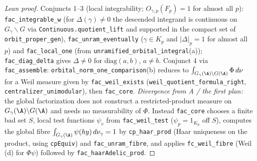 \begin{proof}[Lean proof]
Conjuncts 1--3 (local integrability; $O_{\gamma,p}(F_p)=1$ for almost all $p$): \texttt{fac\_integrable\_w} (for $\Delta(\gamma)\ne0$ the descended integrand is continuous on $G_\gamma\backslash G$ via \texttt{Continuous.quotient\_lift} and supported in the compact set of \texttt{orbit\_proper\_gen}), \texttt{fac\_unram\_eventually} ($\gamma\in K_p$ and $|\Delta|_p=1$ for almost all $p$) and \texttt{fac\_local\_one} (from \texttt{unramified\_orbital\_integral}(a)); \texttt{fac\_diag\_delta} gives $\Delta\ne0$ for $\mathrm{diag}(a,b)$, $a\ne b$. Conjunct 4 via \texttt{fac\_assemble}: \texttt{orbital\_norm\_one\_comparison}(b) reduces to $\int_{G_\gamma(\A)\backslash G(\A)}\Phi\,d\nu$ for a Weil measure given by \texttt{fac\_weil\_exists} (\texttt{weil\_quotient\_formula\_right}, \texttt{centralizer\_unimodular}), then \texttt{fac\_core}. \emph{Divergence from A / the first plan:} the global factorization does not construct a restricted-product measure on $G_\gamma(\A)\backslash G(\A)$ and needs no measurability of $\Phi$. Instead \texttt{fac\_core} chooses a finite bad set $S$, local test functions $\psi_v$ from \texttt{fac\_weil\_test} ($\psi_p=1_{K_p}$ off $S$), computes the global fibre $\int_{G_\gamma(\A)}\psi(hy)\,d\nu_\gamma=1$ by \texttt{cp\_haar\_prod} (Haar uniqueness on the product, using \texttt{cpEquiv}) and \texttt{fac\_unram\_fibre}, and applies \texttt{fc\_weil\_fibre} (Weil (d) for $\Phi\psi$) followed by \texttt{fac\_haarAdelic\_prod}.
\end{proof}


